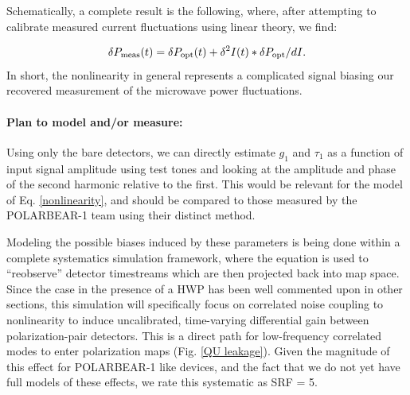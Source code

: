 Schematically, a complete result is the following, where, after attempting to calibrate measured current fluctuations using linear theory, we find:

\begin{equation}
\delta P_{\mbox{\scriptsize meas}} (t) = \delta P_{\mbox{\scriptsize opt}} (t) + \delta^2 I (t) * \delta P_{\mbox{\scriptsize opt}}/dI.
\label{nonlinear_sum}
\end{equation}
In short, the nonlinearity in general represents a complicated signal biasing our recovered measurement of the microwave power fluctuations.

\paragraph{Plan to model and/or measure:}
Using only the bare detectors, we can directly estimate $g_1$ and $\tau_1$ as a function of input signal amplitude using test tones and looking at the amplitude and phase of the second harmonic relative to the first. This would be relevant for the model of Eq. \ref{nonlinearity}, and should be compared to those measured by the POLARBEAR-1 team using their distinct method.

Modeling the possible biases induced by these parameters is being done within a complete systematics simulation framework, where the equation is used to ``reobserve'' detector timestreams which are then projected back into map space. Since the case in the presence of a HWP has been well commented upon in other sections, this simulation will specifically focus on correlated noise coupling to nonlinearity to induce uncalibrated, time-varying differential gain between polarization-pair detectors. This is a direct path for low-frequency correlated modes to enter polarization maps (Fig. \ref{QU leakage}). Given the magnitude of this effect for POLARBEAR-1 like devices, and the fact that we do not yet have full models of these effects, we rate this systematic as SRF = 5.

